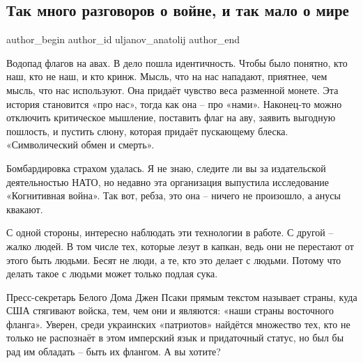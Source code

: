  
 
 
 
 
 
\subsection{Так много разговоров о войне, и так мало о мире}
\label{sec:26_01_2022.fb.uljanov_anatolij.1.vojna_mir}
 
\ifcmt
 author_begin
   author_id uljanov_anatolij
 author_end
\fi

Водопад флагов на авах. В дело пошла идентичность. Чтобы было понятно, кто наш,
кто не наш, и кто кринж. Мысль, что на нас нападают, приятнее, чем мысль, что
нас используют. Она придаёт чувство веса разменной монете. Эта история
становится «про нас», тогда как она – про «нами». Наконец-то можно отключить
критическое мышление, поставить флаг на аву, заявить выгодную пошлость, и
пустить слюну, которая придаёт пускающему блеска. «Символический обмен и
смерть».


Бомбардировка страхом удалась. Я не знаю, следите ли вы за издательской
деятельностью НАТО, но недавно эта организация выпустила исследование
«Когнитивная война». Так вот, ребза, это она – ничего не произошло, а анусы
квакают.

С одной стороны, интересно наблюдать эти технологии в работе. С другой – жалко
людей. В том числе тех, которые лезут в капкан, ведь они не перестают от этого
быть людьми. Бесят не люди, а те, кто это делает с людьми. Потому что делать
такое с людьми может только подлая сука.

Пресс-секретарь Белого Дома Джен Псаки прямым текстом называет страны, куда США
стягивают войска, тем, чем они и являются: «наши страны восточного фланга».
Уверен, среди украинских «патриотов» найдётся множество тех, кто не только не
распознаёт в этом имперский язык и придаточный статус, но был бы рад им
обладать – быть их флангом. А вы хотите?  

